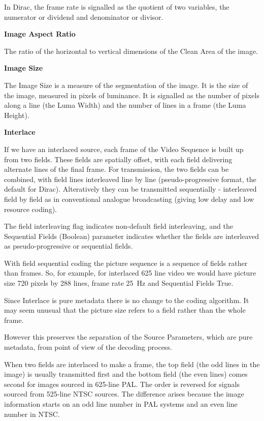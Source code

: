 In Dirac, the frame rate is signalled as the quotient of two variables,
the numerator or dividend and denominator or divisor.

\textbf{Image Aspect Ratio}

The ratio of the horizontal to vertical dimensions of the Clean Area of
the image.

\textbf{Image Size}

The Image Size is a measure of the segmentation of the image. It is the
size of the image, measured in pixels of luminance. It is signalled as
the number of pixels along a line (the Luma Width) and the number of
lines in a frame (the Luma Height).

\textbf{Interlace}

If we have an interlaced source, each frame of the Video Sequence is
built up from two fields. These fields are spatially offset, with each
field delivering alternate lines of the final frame. For transmission,
the two fields can be combined, with field lines interleaved line by
line (pseudo-progressive format, the default for Dirac). Alteratively
they can be transmitted sequentially - interleaved field by field as in
conventional analogue broadcasting (giving low delay and low resource
coding).

The field interleaving flag indicates non-default field interleaving,
and the Sequential Fields (Boolean) parameter indicates whether the
fields are interleaved as pseudo-progressive or sequential fields.

With field sequential coding the picture sequence is a sequence of
fields rather than frames. So, for example, for interlaced 625 line
video we would have picture size 720 pixels by 288 lines, frame rate
25~Hz and Sequential Fields True.

Since Interlace is pure metadata there is no change to the coding
algorithm. It may seem unusual that the picture size refers to a field
rather than the whole frame.

However this preserves the separation of the Source Parameters, which
are pure metadata, from point of view of the decoding process.

When two fields are interlaced to make a frame, the top field (the odd
lines in the image) is usually transmitted first and the bottom field
(the even lines) comes second for images sourced in 625-line PAL. The
order is reversed for signals sourced from 525-line NTSC sources. The
difference arises because the image information starts on an odd line
number in PAL systems and an even line number in NTSC.

